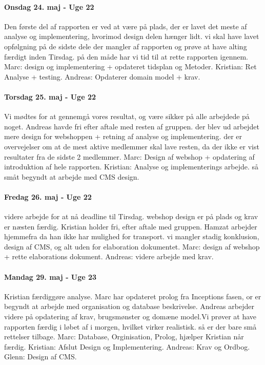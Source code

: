 \paragraph{Onsdag 24. maj - Uge 22}
Den første del af rapporten er ved at være på plads, der er lavet det meste af analyse og implementering, hvorimod design delen hænger lidt. vi skal have lavet opfølgning på de sidste dele der mangler af rapporten og prøve at have alting færdigt inden Tirsdag. på den måde har vi tid til at rette rapporten igennem.
Marc: design og implementering + opdateret tidsplan og Metoder.
Kristian: Ret Analyse + testing. 
Andreas: Opdaterer domain model + krav.
 
\paragraph{Torsdag 25. maj - Uge 22}
Vi mødtes for at gennemgå vores resultat, og være sikker på alle arbejdede på noget. Andreas havde fri efter aftale med resten af gruppen. der blev ud arbejdet mere design for webshoppen + retning af analyse og implementering. der er overvejelser om at de mest aktive medlemmer skal lave resten, da der ikke er vist resultater fra de sidste 2 medlemmer.
Marc: Design af webshop + opdatering af introduktion af hele rapporten.
Kristian: Analyse og implementerings arbejde. så småt begyndt at arbejde med CMS design.
 
\paragraph{Fredag 26. maj - Uge 22}
videre arbejde for at nå deadline til Tirsdag. webshop design er på plads og krav er næsten færdig. Kristian holder fri, efter aftale med gruppen. Hamzat arbejder hjemmefra da han ikke har mulighed for transport. vi mangler stadig konklusion, design af CMS, og alt uden for elaboration dokumentet.
Marc: design af webshop + rette elaborations dokument.
Andreas: videre arbejde med krav.

 
\paragraph{Mandag 29. maj - Uge 23}
Kristian færdiggøre analyse. Marc har opdateret prolog fra Inceptions fasen, or er begyndt at arbejde med organisation og database beskrivelse. Andreas arbejder videre på opdatering af krav, brugsmønster og domæne model.Vi prøver at have rapporten færdig i løbet af i morgen, hvilket virker realistisk. så er der bare små rettelser tilbage.
Marc: Database, Orginisation, Prolog, hjælper Kristian når færdig.
Kristian: Afslut Design og Implementering.
Andreas: Krav og Ordbog.
Glenn: Design af CMS.


